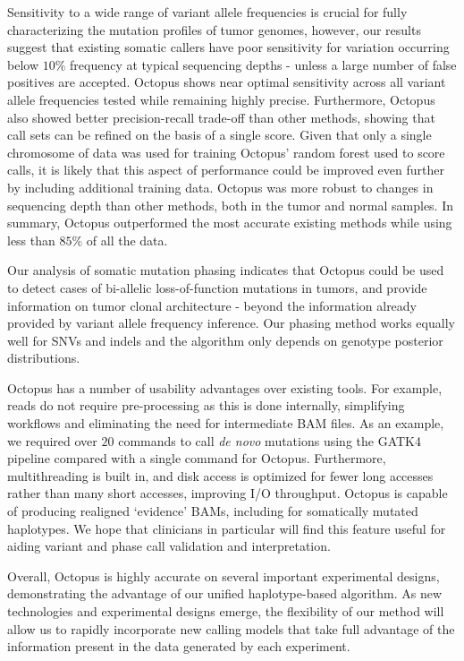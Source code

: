 \documentclass[notitlepage, twocolumn, 10pt]{article}
\begin{document}
Sensitivity to a wide range of variant allele frequencies is crucial for fully characterizing the mutation profiles of tumor genomes, however, our results suggest that existing somatic callers have poor sensitivity for variation occurring below $10\%$ frequency at typical sequencing depths - unless a large number of false positives are accepted. Octopus shows near optimal sensitivity across all variant allele frequencies tested while remaining highly precise. Furthermore, Octopus also showed better precision-recall trade-off than other methods, showing that call sets can be refined on the basis of a single score. Given that only a single chromosome of data was used for training Octopus' random forest used to score calls, it is likely that this aspect of performance could be improved even further by including additional training data. Octopus was more robust to changes in sequencing depth than other methods, both in the tumor and normal samples. In summary, Octopus outperformed the most accurate existing methods while using less than $85\%$ of all the data.

Our analysis of somatic mutation phasing indicates that Octopus could be used to detect cases of bi-allelic loss-of-function mutations in tumors, and provide information on tumor clonal architecture - beyond the information already provided by variant allele frequency inference. Our phasing method works equally well for SNVs and indels and the algorithm only depends on genotype posterior distributions.

Octopus has a number of usability advantages over existing tools.  For example, reads do not require pre-processing as this is done internally, simplifying workflows and eliminating the need for intermediate BAM files. As an example, we required over $20$ commands to call \textit{de novo} mutations using the GATK4 pipeline compared with a single command for Octopus. Furthermore, multithreading is built in, and disk access is optimized for fewer long accesses rather than many short accesses, improving I/O throughput. Octopus is capable of producing realigned `evidence' BAMs, including for somatically mutated haplotypes. We hope that clinicians in particular will find this feature useful for aiding variant and phase call validation and interpretation.

Overall, Octopus is highly accurate on several important experimental designs, demonstrating the advantage of our unified haplotype-based algorithm. As new technologies and experimental designs emerge, the flexibility of our method will allow us to rapidly incorporate new calling models that take full advantage of the information present in the data generated by each experiment.
\end{document}
